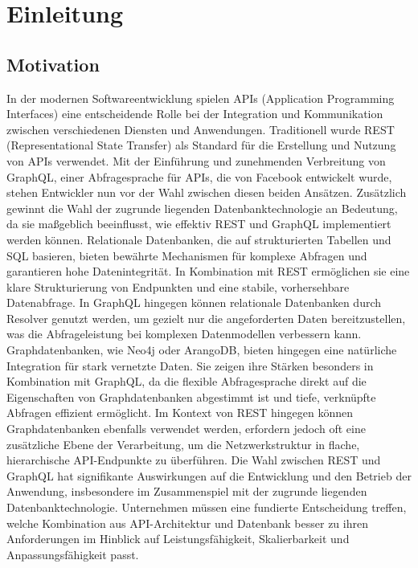 \chapter{Einleitung} %
\label{sec:einleitung}

\section{Motivation} %
\label{sec:motivation}
In der modernen Softwareentwicklung spielen APIs (Application Programming Interfaces) eine entscheidende Rolle bei der Integration und Kommunikation zwischen verschiedenen Diensten und Anwendungen. Traditionell wurde REST (Representational State Transfer) als Standard für die Erstellung und Nutzung von APIs verwendet. Mit der Einführung und zunehmenden Verbreitung von GraphQL, einer Abfragesprache für APIs, die von Facebook entwickelt wurde, stehen Entwickler nun vor der Wahl zwischen diesen beiden Ansätzen.
Zusätzlich gewinnt die Wahl der zugrunde liegenden Datenbanktechnologie an Bedeutung, da sie maßgeblich beeinflusst, wie effektiv REST und GraphQL implementiert werden können. Relationale Datenbanken, die auf strukturierten Tabellen und SQL basieren, bieten bewährte Mechanismen für komplexe Abfragen und garantieren hohe Datenintegrität. In Kombination mit REST ermöglichen sie eine klare Strukturierung von Endpunkten und eine stabile, vorhersehbare Datenabfrage. In GraphQL hingegen können relationale Datenbanken durch Resolver genutzt werden, um gezielt nur die angeforderten Daten bereitzustellen, was die Abfrageleistung bei komplexen Datenmodellen verbessern kann.
Graphdatenbanken, wie Neo4j oder ArangoDB, bieten hingegen eine natürliche Integration für stark vernetzte Daten. Sie zeigen ihre Stärken besonders in Kombination mit GraphQL, da die flexible Abfragesprache direkt auf die Eigenschaften von Graphdatenbanken abgestimmt ist und tiefe, verknüpfte Abfragen effizient ermöglicht. Im Kontext von REST hingegen können Graphdatenbanken ebenfalls verwendet werden, erfordern jedoch oft eine zusätzliche Ebene der Verarbeitung, um die Netzwerkstruktur in flache, hierarchische API-Endpunkte zu überführen. Die Wahl zwischen REST und GraphQL hat signifikante Auswirkungen auf die Entwicklung und den Betrieb der Anwendung, insbesondere im Zusammenspiel mit der zugrunde liegenden Datenbanktechnologie. Unternehmen müssen eine fundierte Entscheidung treffen, welche Kombination aus API-Architektur und Datenbank besser zu ihren Anforderungen im Hinblick auf Leistungsfähigkeit, Skalierbarkeit und Anpassungsfähigkeit passt.


